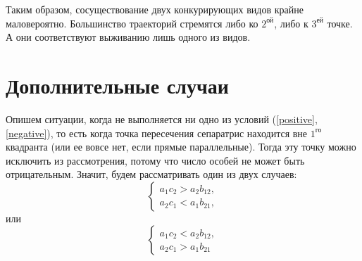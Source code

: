 \documentclass[12pt,a4paper]{article}
\begin{document}
    Таким образом, сосуществование двух конкурирующих видов крайне маловероятно. Большинство траекторий стремятся либо ко $ 2^{\text{ой}} $, либо к $ 3^{\text{ей}} $ точке. А они соответствуют выживанию лишь одного из видов.

    \section{Дополнительные случаи}
    Опишем ситуации, когда не выполняется ни одно из условий (\ref{positive},\,\ref{negative}), то есть когда точка пересечения сепаратрис находится вне $1^{\text{го}}$ квадранта (или ее вовсе нет, если прямые параллельные). Тогда эту точку можно исключить из рассмотрения, потому что число особей не может быть отрицательным. Значит, будем рассматривать один из двух случаев:
    \begin{equation}
        \label{posneg}
        \begin{cases}
            a_1 c_2 > a_2 b_{12},
            \\
            a_2 c_1 < a_1 b_{21},
        \end{cases}
    \end{equation}
    \noindent или
    \begin{equation}
        \label{negpos}
        \begin{cases}
            a_1 c_2 < a_2 b_{12},
            \\
            a_2 c_1 > a_1 b_{21}
        \end{cases}
    \end{equation}
\end{document}
